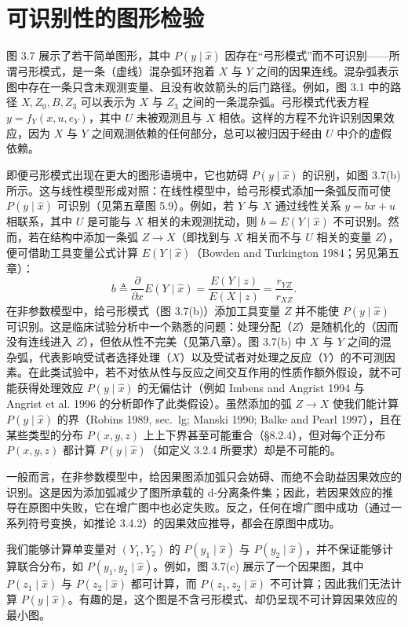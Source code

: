 \section{可识别性的图形检验}

图 3.7 展示了若干简单图形，其中 $P(y\mid\hat{x})$ 因存在“弓形模式”而不可识别——所谓弓形模式，是一条（虚线）混杂弧环抱着 $X$ 与 $Y$ 之间的因果连线。混杂弧表示图中存在一条只含未观测变量、且没有收敛箭头的后门路径。例如，图 3.1 中的路径 $X,Z_0,B,Z_3$ 可以表示为 $X$ 与 $Z_3$ 之间的一条混杂弧。弓形模式代表方程 $y=f_Y(x,u,e_Y)$，其中 $U$ 未被观测且与 $X$ 相依。这样的方程不允许识别因果效应，因为 $X$ 与 $Y$ 之间观测依赖的任何部分，总可以被归因于经由 $U$ 中介的虚假依赖。

即便弓形模式出现在更大的图形语境中，它也妨碍 $P(y\mid\hat{x})$ 的识别，如图 3.7(b) 所示。这与线性模型形成对照：在线性模型中，给弓形模式添加一条弧反而可使 $P(y\mid\hat{x})$ 可识别（见第五章图 5.9）。例如，若 $Y$ 与 $X$ 通过线性关系 $y=bx+u$ 相联系，其中 $U$ 是可能与 $X$ 相关的未观测扰动，则 $b=E(Y\mid\hat{x})$ 不可识别。然而，若在结构中添加一条弧 $Z\to X$（即找到与 $X$ 相关而不与 $U$ 相关的变量 $Z$），便可借助工具变量公式计算 $E(Y\mid\hat{x})$（Bowden and Turkington 1984；另见第五章）：
\begin{equation}
b\triangleq\frac{\partial}{\partial x}E(Y\mid\hat{x})=\frac{E(Y\mid z)}{E(X\mid z)}=\frac{r_{YZ}}{r_{XZ}}. \tag{3.46}
\end{equation}
在非参数模型中，给弓形模式（图 3.7(b)）添加工具变量 $Z$ 并不能使 $P(y\mid\hat{x})$ 可识别。这是临床试验分析中一个熟悉的问题：处理分配（$Z$）是随机化的（因而没有连线进入 $Z$），但依从性不完美（见第八章）。图 3.7(b) 中 $X$ 与 $Y$ 之间的混杂弧，代表影响受试者选择处理（$X$）以及受试者对处理之反应（$Y$）的不可测因素。在此类试验中，若不对依从性与反应之间交互作用的性质作额外假设，就不可能获得处理效应 $P(y\mid\hat{x})$ 的无偏估计（例如 Imbens and Angrist 1994 与 Angrist et al. 1996 的分析即作了此类假设）。虽然添加的弧 $Z\to X$ 使我们能计算 $P(y\mid\hat{x})$ 的界（Robins 1989, sec.~lg; Manski 1990; Balke and Pearl 1997），且在某些类型的分布 $P(x,y,z)$ 上上下界甚至可能重合（\S 8.2.4），但对每个正分布 $P(x,y,z)$ 都计算 $P(y\mid\hat{x})$（如定义 3.2.4 所要求）却是不可能的。

一般而言，在非参数模型中，给因果图添加弧只会妨碍、而绝不会助益因果效应的识别。这是因为添加弧减少了图所承载的 d-分离条件集；因此，若因果效应的推导在原图中失败，它在增广图中也必定失败。反之，任何在增广图中成功（通过一系列符号变换，如推论 3.4.2）的因果效应推导，都会在原图中成功。

我们能够计算单变量对 $(Y_1,Y_2)$ 的 $P(y_1\mid\hat{x})$ 与 $P(y_2\mid\hat{x})$，并不保证能够计算联合分布，如 $P(y_1,y_2\mid\hat{x})$。例如，图 3.7(c) 展示了一个因果图，其中 $P(z_1\mid\hat{x})$ 与 $P(z_2\mid\hat{x})$ 都可计算，而 $P(z_1,z_2\mid\hat{x})$ 不可计算；因此我们无法计算 $P(y\mid\hat{x})$。有趣的是，这个图是不含弓形模式、却仍呈现不可计算因果效应的最小图。

